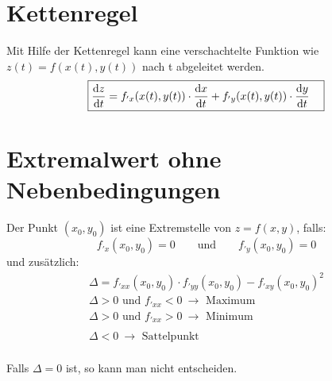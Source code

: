 	
\section{Kettenregel}
Mit Hilfe der Kettenregel kann eine verschachtelte Funktion wie $z(t)=f(x(t),y(t))$ nach t abgeleitet werden.
\[\boxed{\begin{aligned}	
		\frac{\mathrm{d} z}{\mathrm{d} t}&= f_{'x}(x(t),y(t))\cdot \frac{\mathrm{d} x}{\mathrm{d} t}+f_{'y}(x(t),y(t))\cdot \frac{\mathrm{d} y}{\mathrm{d} t}
\end{aligned}}\]
	
\section{Extremalwert ohne Nebenbedingungen}
Der Punkt $(x_0,y_0)$ ist eine Extremstelle von $z=f(x,y)$, falls:
\[\boxed{
	f_{'x}(x_0,y_0) = 0 \qquad \text{und} \qquad f_{'y}(x_0,y_0)=0
}\] und 
zusätzlich:
\[
\boxed{\begin{array}{l}
	\Delta=f_{'xx}(x_0,y_0)\cdot f_{'yy}(x_0,y_0)-f_{'xy}(x_0,y_0)^2\\
	\Delta > 0 \text{ und }f_{'xx} < 0 \ \rightarrow\text{ Maximum}\\
	\Delta > 0 \text{ und }f_{'xx} > 0 \ \rightarrow\text{ Minimum}
	\\\\
	\Delta < 0 \ \rightarrow \text{ Sattelpunkt}
	\end{array}}\]
\\
Falls $\Delta =0$ ist, so kann man nicht entscheiden.


